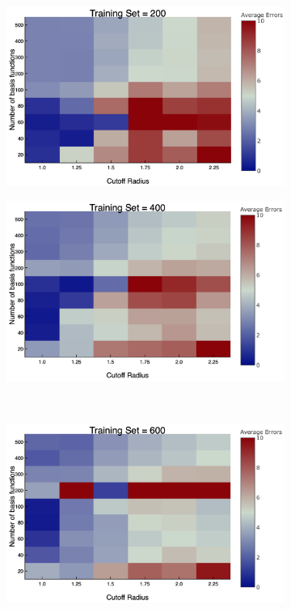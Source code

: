 \begin{figure}
  \begin{subfigure}{0.5\textwidth}
    \includegraphics[width=\linewidth]{Figures/aveErrors2}
    \caption{} 
    \label{aveErrors2}
  \end{subfigure}%
  \hspace*{\fill}   %
  \begin{subfigure}{0.5\textwidth}
    \includegraphics[width=\linewidth]{Figures/aveErrors4}
    \caption{} 
    \label{aveErrors4}
  \end{subfigure}%
    \\
  \begin{subfigure}{0.5\textwidth}
    \includegraphics[width=\linewidth]{Figures/aveErrors6}

\end{subfigure}
\end{figure}
